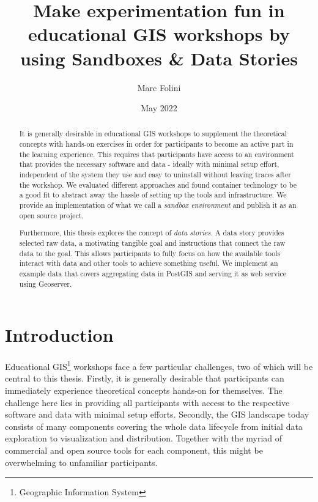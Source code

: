 \documentclass[11pt, a4paper, oneside, parskip=full-]{scrartcl}
\title{Make experimentation fun in educational GIS workshops by using Sandboxes \& Data Stories}
\author{Marc Folini}
\date{May 2022}
\begin{document}
\begin{titlepage}
  \setcounter{page}{1}
  \clearpage\maketitle
  \thispagestyle{empty}
  \begin{abstract}
    It is generally desirable in educational GIS workshops to supplement the theoretical concepts with hands-on
    exercises in order for participants to become an active part in the learning experience. This requires that
    participants have access to an environment that provides the necessary software and data - ideally with minimal
    setup effort, independent of the system they use and easy to uninstall without leaving traces after the workshop. We
    evaluated different approaches and found container technology to be a good fit to abstract away the hassle of
    setting up the tools and infrastructure. We provide an implementation of what we call a \emph{sandbox environment}
    and publish it as an open source project.

    Furthermore, this thesis explores the concept of \emph{data stories}. A data story provides selected raw data, a
    motivating tangible goal and instructions that connect the raw data to the goal. This allows participants to fully
    focus on how the available tools interact with data and other tools to achieve something useful. We implement an
    example data that covers aggregating data in PostGIS and serving it as web service using Geoserver.
  \end{abstract}
\end{titlepage}

\newpage
\tableofcontents

\newpage
{}
\setcounter{page}{1}
\section{Introduction}
Educational GIS\footnote{Geographic Information System} workshops face a few particular challenges, two of which will be
central to this thesis. Firstly, it is generally desirable that participants can immediately experience theoretical
concepts hands-on for themselves. The challenge here lies in providing all participants with access to the respective
software and data with minimal setup efforts. Secondly, the GIS landscape today consists of many components covering the
whole data lifecycle from initial data exploration to visualization and distribution. Together with the myriad of
commercial and open source tools for each component, this might be overwhelming to unfamiliar participants.
\end{document}
